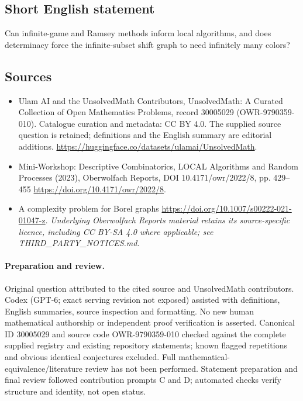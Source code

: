 \documentclass[11pt]{article}
\begin{document}
\subsection{Short English statement}
Can infinite-game and Ramsey methods inform local algorithms, and does determinacy force the infinite-subset shift graph to need infinitely many colors?
\subsection{Sources}
\begin{itemize}
\item[\hypertarget{source:30005029:1}{S1}] Ulam AI and the UnsolvedMath Contributors, UnsolvedMath: A Curated Collection of Open Mathematics Problems, record 30005029 (OWR-9790359-010). Catalogue curation and metadata: CC BY 4.0. The supplied source question is retained; definitions and the English summary are editorial additions.
\url{https://huggingface.co/datasets/ulamai/UnsolvedMath}.
\item[\hypertarget{source:30005029:2}{S2}] Mini-Workshop: Descriptive Combinatorics, LOCAL Algorithms and Random Processes (2023), Oberwolfach Reports, DOI 10.4171/owr/2022/8, pp. 429--455
\url{https://doi.org/10.4171/owr/2022/8}.
\item[\hypertarget{source:30005029:3}{S3}] A complexity problem for Borel graphs
\url{https://doi.org/10.1007/s00222-021-01047-z}.
\textit{Underlying Oberwolfach Reports material retains its source-specific licence, including CC BY-SA 4.0 where applicable; see THIRD\_PARTY\_NOTICES.md.}
\end{itemize}
\paragraph{Preparation and review.}
Original question attributed to the cited source and UnsolvedMath contributors. Codex (GPT-6; exact serving revision not exposed) assisted with definitions, English summaries, source inspection and formatting. No new human mathematical authorship or independent proof verification is asserted. Canonical ID 30005029 and source code OWR-9790359-010 checked against the complete supplied registry and existing repository statements; known flagged repetitions and obvious identical conjectures excluded. Full mathematical-equivalence/literature review has not been performed. Statement preparation and final review followed contribution prompts C and D; automated checks verify structure and identity, not open status.
\label{end:30005029}
\end{document}
